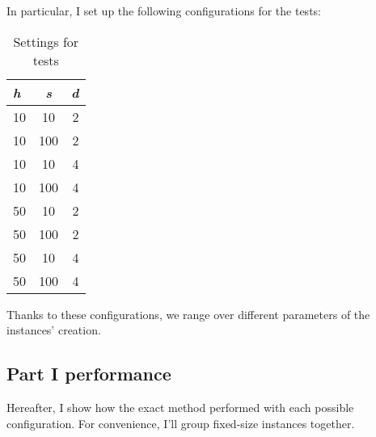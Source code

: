 In particular, I set up the following configurations for the tests:

\begin{table}[H]
  \centering
  \begin{tabular}{|l|c|r|}
    \hline
    \textbf{\textit{h}} & \textbf{\textit{s}} & \textbf{\textit{d}} \\
    \hline
    \hline
    10 & 10  & 2 \\
    \hline
    10 & 100 & 2 \\
    \hline
    10 & 10  & 4 \\
    \hline
    10 & 100 & 4 \\
    \hline
    50 & 10  & 2 \\
    \hline
    50 & 100 & 2 \\
    \hline
    50 & 10  & 4 \\
    \hline
    50 & 100 & 4 \\
    \hline
  \end{tabular}
  \caption{Settings for tests}
  \label{tab:settings}
\end{table}

Thanks to these configurations, we range over different parameters of the
instances' creation.

\subsection{Part I performance}

Hereafter, I show how the exact method performed with each possible
configuration. For convenience, I'll group fixed-size instances together.

